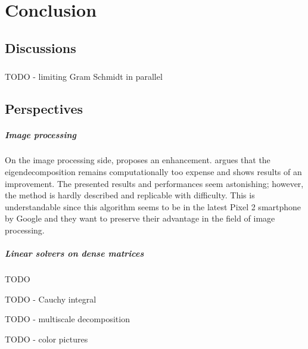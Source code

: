 \chapter{Conclusion}

\section{Discussions}

\paragraph{}
TODO - limiting Gram Schmidt in parallel

\section{Perspectives}

\paragraph{Image processing}
On the image processing side, \cite{talebi_fast_2016} proposes an enhancement.
\cite{talebi_fast_2016} argues that the eigendecomposition remains computationally too expense and shows results of an improvement.
The presented results and performances seem astonishing; however, the method is hardly described and replicable with difficulty.
This is understandable since this algorithm seems to be in the latest Pixel 2 smartphone by Google and they want to preserve their advantage in the field of image processing.

\paragraph{Linear solvers on dense matrices}
TODO

TODO - Cauchy integral

TODO - multiscale decomposition

TODO - color pictures
